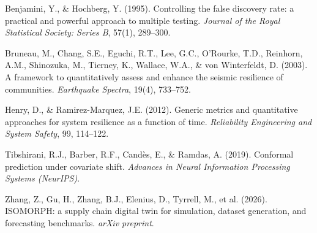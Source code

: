  Benjamini, Y., \& Hochberg, Y. (1995). Controlling the false discovery rate: a practical and powerful approach to multiple testing. \textit{Journal of the Royal Statistical Society: Series B}, 57(1), 289--300.

 Bruneau, M., Chang, S.E., Eguchi, R.T., Lee, G.C., O'Rourke, T.D., Reinhorn, A.M., Shinozuka, M., Tierney, K., Wallace, W.A., \& von Winterfeldt, D. (2003). A framework to quantitatively assess and enhance the seismic resilience of communities. \textit{Earthquake Spectra}, 19(4), 733--752.

 Henry, D., \& Ramirez-Marquez, J.E. (2012). Generic metrics and quantitative approaches for system resilience as a function of time. \textit{Reliability Engineering and System Safety}, 99, 114--122.

 Tibshirani, R.J., Barber, R.F., Cand\`es, E., \& Ramdas, A. (2019). Conformal prediction under covariate shift. \textit{Advances in Neural Information Processing Systems (NeurIPS)}.

 Zhang, Z., Gu, H., Zhang, B.J., Elenius, D., Tyrrell, M., et al. (2026). ISOMORPH: a supply chain digital twin for simulation, dataset generation, and forecasting benchmarks. \textit{arXiv preprint}.
